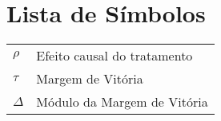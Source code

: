 \documentclass[12pt,twoside,a4paper]{book}
\renewcommand{\chaptermark}[1]{\markboth{\MakeUppercase{#1}}{}}
\begin{document}
\chapter{Lista de Símbolos}
\begin{tabular}{ll}
        $\rho$    & Efeito causal do tratamento\\
        $\tau$    & Margem de Vitória\\
        $\Delta$      & Módulo da Margem de Vitória\\
\end{tabular}

\listoffigures
\listoftables
       
\mainmatter


\onehalfspacing









\backmatter \singlespacing
 


\renewcommand{\chaptermark}[1]{\markboth{\MakeUppercase{\appendixname\ \thechapter}} {\MakeUppercase{#1}} }
\fancyhead[RE,LO]{}
\end{document}
